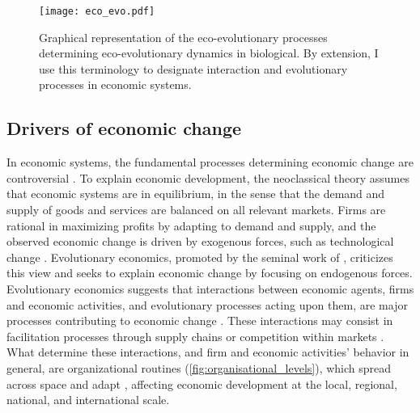 \begin{figure}[ht]
    \centering
    \texttt{[image: eco\_evo.pdf]}
\caption{Graphical representation of the eco-evolutionary processes determining eco-evolutionary dynamics in biological. By extension, I use this terminology to designate interaction and evolutionary processes in economic systems.}
\label{fig:eco_evo}
\end{figure}

\subsection{Drivers of economic change}
In economic systems, the fundamental processes determining economic change are controversial \citep{Dopfer2007,Nelson2014,Hodgson2019}. 
To explain economic development, the neoclassical theory \citep{10.1093/cje/bet027} assumes that economic systems are in equilibrium, in the sense that the demand and supply of goods and services are balanced on all relevant markets. 
Firms are rational in maximizing profits by adapting to demand and supply, and the observed economic change is driven by exogenous forces, such as technological change \citep{Romer1986}. Evolutionary economics, promoted by the seminal work of \cite{Nelson2014}, criticizes this view and seeks to explain economic change by focusing on endogenous forces. 
% 
Evolutionary economics suggests that interactions between economic agents, firms and economic activities, and evolutionary processes acting upon them, are major processes contributing to economic change \citep{Hodgson2019}.
% 
These interactions may consist in facilitation processes through supply chains \citep{Ozman2009,Saavedra2009a,VanDerPanne2004} or competition within markets \citep{Wernerfelt1989}. What determine these interactions, and firm and economic activities' behavior in general, are organizational routines (\cref{fig:organisational_levels}), which spread across space and adapt \citep{Cordes2006}, affecting economic development at the local, regional, national, and international scale.
%
